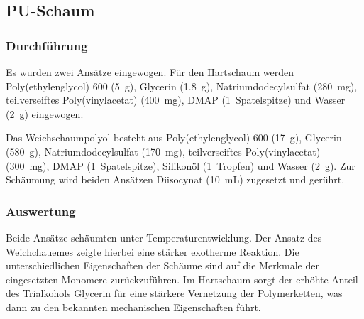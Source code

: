 \documentclass[12pt, bibliography=totocnumbered]{scrartcl}
\begin{document}
\subsection{PU-Schaum}
\subsubsection{Durchführung}
Es wurden zwei Ansätze eingewogen. Für den Hartschaum werden Poly(ethylenglycol) 600 (\SI{5}{g}), Glycerin (\SI{1,8}{g}), Natriumdodecylsulfat (\SI{280}{mg}), teilverseiftes Poly(vinylacetat) (\SI{400}{mg}), DMAP (\SI{1}{Spatelspitze}) und Wasser (\SI{2}{g}) eingewogen.\par
Das Weichschaumpolyol besteht aus Poly(ethylenglycol) 600 (\SI{17}{g}), Glycerin (\SI{580}{g}), Natriumdodecylsulfat (\SI{170}{mg}), teilverseiftes Poly(vinylacetat) (\SI{300}{mg}), DMAP (\SI{1}{Spatelspitze}), Silikonöl (\SI{1}{Tropfen}) und Wasser (\SI{2}{g}). Zur Schäumung wird beiden Ansätzen Diisocynat (\SI{10}{mL}) zugesetzt und gerührt.
\subsubsection{Auswertung}
Beide Ansätze schäumten unter Temperaturentwicklung. Der Ansatz des Weichchauemes zeigte hierbei eine stärker exotherme Reaktion. Die unterschiedlichen Eigenschaften der Schäume sind auf die Merkmale der eingesetzten Monomere zurückzuführen. Im Hartschaum sorgt der erhöhte Anteil des Trialkohols Glycerin für eine stärkere Vernetzung der Polymerketten, was dann zu den bekannten mechanischen Eigenschaften führt.
\newpage
\end{document}
